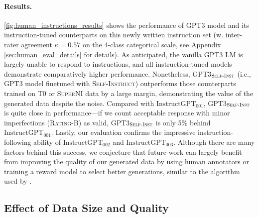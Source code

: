 \paragraph{Results.}
\autoref{fig:human_instructions_results} shows the performance of \textsc{GPT3} model and its instruction-tuned counterparts on this newly written instruction set (w. inter-rater agreement  $\kappa=0.57$ on the 4-class categorical scale, see Appendix \ref{sec:human_eval_details} for details). As anticipated, the vanilla \textsc{GPT3} LM is largely unable to respond to instructions, and all instruction-tuned models demonstrate comparatively higher performance. Nonetheless, \textsc{GPT3}$_{\textsc{Self-Inst}}$ (i.e.,  \textsc{GPT3} model finetuned with \textsc{Self-Instruct}) outperforms those counterparts trained on \textsc{T$0$} or \textsc{SuperNI} data by a large margin, demonstrating the value of the generated data despite the noise. Compared with $\text{InstructGPT}_{\text{001}}$, \textsc{GPT3}$_{\textsc{Self-Inst}}$ is quite close in performance---if we count acceptable response with minor imperfections (\textsc{Rating-B}) as valid, \textsc{GPT3}$_{\textsc{Self-Inst}}$ is only 5\% behind $\text{InstructGPT}_{\text{001}}$. Lastly, our evaluation confirms the impressive instruction-following ability of $\text{InstructGPT}_{\text{002}}$ and $\text{InstructGPT}_{\text{003}}$. Although there are many factors behind this success, we conjecture that future work can largely benefit from improving the quality of our generated data by using human annotators or training a reward model to select better generations, similar to the algorithm used by \citet{ouyang2022training}.

\subsection{Effect of Data Size and Quality}
\label{subsec:size-and-quality-analysis}

